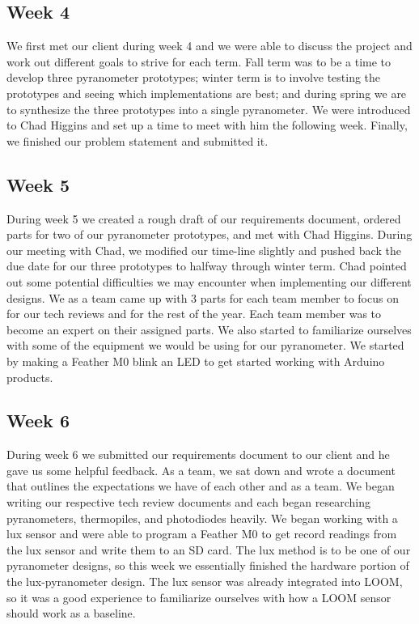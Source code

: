 \documentclass[10pt,draftclsnofoot,onecolumn,letterpaper]{article}
\begin{document}
\subsection{Week 4}
We first met our client during week 4 and we were able to discuss the project and work out different goals to strive for each term. Fall term was to be a time to develop three pyranometer prototypes; winter term is to involve testing the prototypes and seeing which implementations are best; and during spring we are to synthesize the three prototypes into a single pyranometer. We were introduced to Chad Higgins and set up a time to meet with him the following week. Finally, we finished our problem statement and submitted it.
\subsection{Week 5}
During week 5 we created a rough draft of our requirements document, ordered parts for two of our pyranometer prototypes, and met with Chad Higgins. During our meeting with Chad, we modified our time-line slightly and pushed back the due date for our three prototypes to halfway through winter term. Chad pointed out some potential difficulties we may encounter when implementing our different designs. We as a team came up with 3 parts for each team member to focus on for our tech reviews and for the rest of the year. Each team member was to become an expert on their assigned parts. We also started to familiarize ourselves with some of the equipment we would be using for our pyranometer. We started by making a Feather M0 blink an LED to get started working with Arduino products. 
\subsection{Week 6}
During week 6 we submitted our requirements document to our client and he gave us some helpful feedback. As a team, we sat down and wrote a document that outlines the expectations we have of each other and as a team. We began writing our respective tech review documents and each began researching pyranometers, thermopiles, and photodiodes heavily. We began working with a lux sensor and were able to program a Feather M0 to get record readings from the lux sensor and write them to an SD card. The lux method is to be one of our pyranometer designs, so this week we essentially finished the hardware portion of the lux-pyranometer design. The lux sensor was already integrated into LOOM, so it was a good experience to familiarize ourselves with how a LOOM sensor should work as a baseline. 
\end{document}
